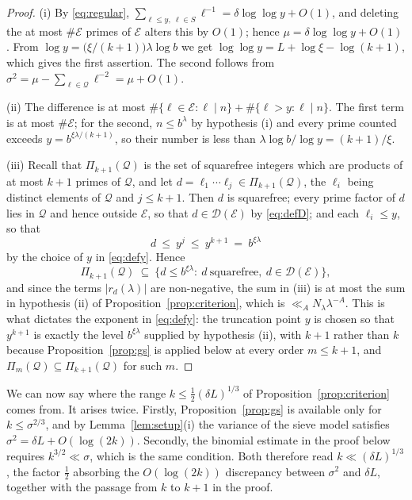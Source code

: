 \documentclass[11pt,a4paper]{article}
\theoremstyle{plain}
\theoremstyle{definition}
\numberwithin{equation}{section}
\begin{document}
\begin{proof}
(i) By \eqref{eq:regular}, $\sum_{\ell\le y,\ \ell\in S}\ell^{-1}=\delta\log\log y+O(1)$, and deleting the
at most $\#\mathcal E$ primes of $\mathcal E$ alters this by $O(1)$; hence $\mu=\delta\log\log y+O(1)$.
From $\log y=\bigl(\xi/(k+1)\bigr)\lambda\log b$ we get $\log\log y=L+\log\xi-\log(k+1)$, which
gives the first assertion. The second follows from
$\sigma^{2}=\mu-\sum_{\ell\in\mathcal Q}\ell^{-2}=\mu+O(1)$.

(ii) The difference is at most $\#\{\ell\in\mathcal E:\ell\mid n\}+\#\{\ell>y:\ell\mid n\}$. The first term
is at most $\#\mathcal E$; for the second, $n\le b^{\lambda}$ by hypothesis (i) and every prime counted
exceeds $y=b^{\xi\lambda/(k+1)}$, so their number is less than $\lambda\log b/\log y=(k+1)/\xi$.

(iii) Recall that $\Pi_{k+1}(\mathcal Q)$ is the set of squarefree integers which are products of at
most $k+1$ primes of $\mathcal Q$, and let $d=\ell_1\cdots\ell_j\in \Pi_{k+1}(\mathcal Q)$, the
$\ell_i$ being distinct elements of $\mathcal Q$ and $j\le k+1$. Then $d$ is squarefree; every prime
factor of $d$ lies in $\mathcal Q$ and hence outside $\mathcal E$, so that
$d\in\mathcal D(\mathcal E)$ by \eqref{eq:defD}; and each $\ell_i\le y$, so that
\[
d\ \le\ y^{j}\ \le\ y^{k+1}\ =\ b^{\xi\lambda}
\]
by the choice of $y$ in \eqref{eq:defy}. Hence
\[
\Pi_{k+1}(\mathcal Q)\ \subseteq\
\bigl\{d\le b^{\xi\lambda}:\ d\ \text{squarefree},\ d\in\mathcal D(\mathcal E)\bigr\},
\]
and since the terms $|r_d(\lambda)|$ are non-negative, the sum in (iii) is at most the sum in
hypothesis (ii) of Proposition~\ref{prop:criterion}, which is $\ll_A N_\lambda\lambda^{-A}$. This is
what dictates the exponent in \eqref{eq:defy}: the truncation point $y$ is chosen so that $y^{k+1}$
is exactly the level $b^{\xi\lambda}$ supplied by hypothesis (ii), with $k+1$ rather than $k$
because Proposition~\ref{prop:gs} is applied below at every order $m\le k+1$, and
$\Pi_m(\mathcal Q)\subseteq \Pi_{k+1}(\mathcal Q)$ for such $m$.
\end{proof}

We can now say where the range $k\le\frac12(\delta L)^{1/3}$ of Proposition~\ref{prop:criterion} comes
from. It arises twice. Firstly, Proposition~\ref{prop:gs} is available only for
$k\le\sigma^{2/3}$, and by Lemma~\ref{lem:setup}(i) the variance of the sieve model satisfies
$\sigma^{2}=\delta L+O(\log(2k))$. Secondly, the binomial estimate in the proof below requires
$k^{3/2}\ll\sigma$, which is the same condition. Both therefore read $k\ll(\delta L)^{1/3}$, the factor
$\frac12$ absorbing the $O(\log(2k))$ discrepancy between $\sigma^{2}$ and $\delta L$, together with the
passage from $k$ to $k+1$ in the proof.
\end{document}
